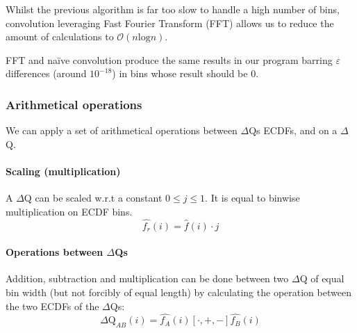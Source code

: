     Whilst the previous algorithm is far too slow to handle a high number of bins, convolution leveraging Fast Fourier Transform (FFT) allows us to reduce the amount of calculations to $\mathcal{O}(n \text{log} n)$. 
    
    FFT and naïve convolution produce the same results in our program barring $\varepsilon$ differences (around $10^{-18}$) in bins whose result should be 0.

    \subsubsection{Arithmetical operations}
        We can apply a set of arithmetical operations between $\Delta$Qs ECDFs, and on a $\Delta$Q.
    \paragraph{Scaling (multiplication)} A $\Delta$Q can be scaled w.r.t a constant $0 \le j \le 1$. It is equal to binwise multiplication on ECDF bins.
    \begin{equation}
        \hat{f_r}(i) = \hat{f}(i) \cdot j
        \label{eq:mul_ecdf}
    \end{equation}

    \paragraph{Operations between $\Delta$Qs} 
        Addition, subtraction and multiplication can be done between two $\Delta$Q of equal bin width (but not forcibly of equal length) by calculating the operation between the two ECDFs of the $\Delta$Qs:
        \begin{equation}
            \Delta \text{Q}_{AB}(i) = \hat{f_A}(i) [\cdot, +, -] \hat{f_B}(i)
            \label{eq:op_dq}
        \end{equation}
